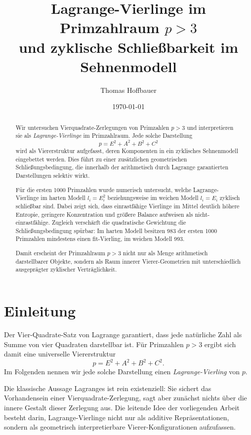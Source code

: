 \documentclass[11pt,a4paper]{article}
\title{Lagrange-Vierlinge im Primzahlraum \(p>3\)\\
	und zyklische Schließbarkeit im Sehnenmodell}
\author{Thomas Hoffbauer}
\date{\today}
\theoremstyle{remark}
\begin{document}
	\maketitle
	
	\begin{abstract}
		Wir untersuchen Vierquadrate-Zerlegungen von Primzahlen \(p>3\) und interpretieren sie als \emph{Lagrange-Vierlinge} im Primzahlraum. Jede solche Darstellung
		\[
		p = E^2 + A^2 + B^2 + C^2
		\]
		wird als Viererstruktur aufgefasst, deren Komponenten in ein zyklisches Sehnenmodell eingebettet werden. Dies führt zu einer zusätzlichen geometrischen Schließungsbedingung, die innerhalb der arithmetisch durch Lagrange garantierten Darstellungen selektiv wirkt.
		
		Für die ersten 1000 Primzahlen wurde numerisch untersucht, welche Lagrange-Vierlinge im harten Modell \(l_i = E_i^2\) beziehungsweise im weichen Modell \(l_i = E_i\) zyklisch schließbar sind. Dabei zeigt sich, dass einrastfähige Vierlinge im Mittel deutlich höhere Entropie, geringere Konzentration und größere Balance aufweisen als nicht-einrastfähige. Zugleich verschärft die quadratische Gewichtung die Schließungsbedingung spürbar: Im harten Modell besitzen 983 der ersten 1000 Primzahlen mindestens einen fit-Vierling, im weichen Modell 993.
		
		Damit erscheint der Primzahlraum \(p>3\) nicht nur als Menge arithmetisch darstellbarer Objekte, sondern als Raum innerer Vierer-Geometrien mit unterschiedlich ausgeprägter zyklischer Verträglichkeit.
	\end{abstract}
	
	\section{Einleitung}
	
	Der Vier-Quadrate-Satz von Lagrange garantiert, dass jede natürliche Zahl als Summe von vier Quadraten darstellbar ist. Für Primzahlen \(p>3\) ergibt sich damit eine universelle Viererstruktur
	\[
	p = E^2 + A^2 + B^2 + C^2.
	\]
	Im Folgenden nennen wir jede solche Darstellung einen \emph{Lagrange-Vierling} von \(p\).
	
	Die klassische Aussage Lagranges ist rein existenziell: Sie sichert das Vorhandensein einer Vierquadrate-Zerlegung, sagt aber zunächst nichts über die innere Gestalt dieser Zerlegung aus. Die leitende Idee der vorliegenden Arbeit besteht darin, Lagrange-Vierlinge nicht nur als additive Repräsentationen, sondern als geometrisch interpretierbare Vierer-Konfigurationen aufzufassen.
	
\end{document}
